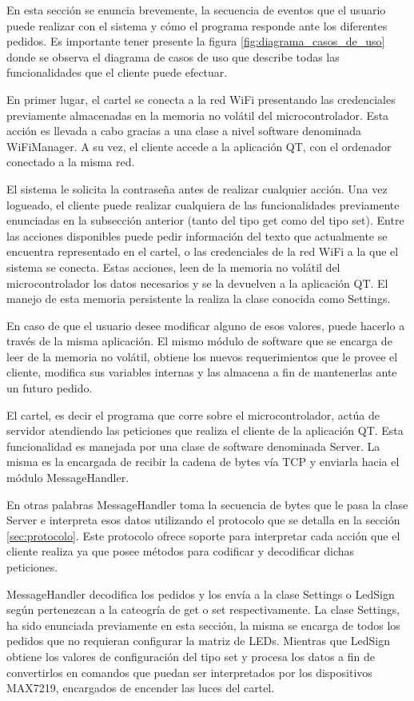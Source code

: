 En esta sección se enuncia brevemente, la secuencia de eventos que el usuario puede realizar con el sistema y cómo el programa responde ante los diferentes pedidos.
Es importante tener presente la figura \ref{fig:diagrama_casos_de_uso} donde se observa el diagrama de casos de uso que describe todas las funcionalidades que el cliente puede efectuar.

En primer lugar, el cartel se conecta a la red WiFi presentando las credenciales previamente almacenadas en la memoria no volátil del microcontrolador.
Esta acción es llevada a cabo gracias a una clase a nivel software denominada WiFiManager.
A su vez, el cliente accede a la aplicación QT, con el ordenador conectado a la misma red.

El sistema le solicita la contraseña antes de realizar cualquier acción.
Una vez logueado, el cliente puede realizar cualquiera de las funcionalidades previamente enunciadas en la subsección anterior (tanto del tipo get como del tipo set).
Entre las acciones disponibles puede pedir información del texto que actualmente se encuentra representado en el cartel, o las credenciales de la red WiFi a la que el sistema se conecta.
Estas acciones, leen de la memoria no volátil del microcontrolador los datos necesarios y se la devuelven a la aplicación QT.
El manejo de esta memoria persistente la realiza la clase conocida como Settings.

En caso de que el usuario desee modificar alguno de esos valores, puede hacerlo a través de la misma aplicación.
El mismo módulo de software que se encarga de leer de la memoria no volátil, obtiene los nuevos requerimientos que le provee el cliente, modifica sus variables internas y las almacena a fin de mantenerlas ante un futuro pedido.

El cartel, es decir el programa que corre sobre el microcontrolador, actúa de servidor atendiendo las peticiones que realiza el cliente de la aplicación QT.
Esta funcionalidad es manejada por una clase de software denominada Server.
La misma es la encargada de recibir la cadena de bytes vía TCP y enviarla hacia el módulo MessageHandler.

En otras palabras MessageHandler toma la secuencia de bytes que le pasa la clase Server e interpreta esos datos utilizando el protocolo que se detalla en la sección \ref{sec:protocolo}.
Este protocolo ofrece soporte para interpretar cada acción que el cliente realiza ya que posee métodos para codificar y decodificar dichas peticiones.

MessageHandler decodifica los pedidos y los envía a la clase Settings o LedSign según pertenezcan a la cateogría de get o set respectivamente.
La clase Settings, ha sido enunciada previamente en esta sección, la misma se encarga de todos los pedidos que no requieran configurar la matriz de LEDs.
Mientras que LedSign obtiene los valores de configuración del tipo set y procesa los datos a fin de convertirlos en comandos que puedan ser interpretados por los dispositivos MAX7219, encargados de encender las luces del cartel.

